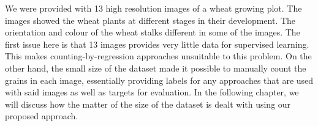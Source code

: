 We were provided with 13 high resolution images of a wheat growing plot. The images showed the wheat plants at different stages in their development. The orientation and colour of the wheat stalks different in some of the images. 
The first issue here is that 13 images provides very little data for supervised learning. This makes counting-by-regression approaches unsuitable to this problem. On the other hand, the small size of the dataset made it possible to manually count the grains in each image, essentially providing labels for any approaches that are used with said images as well as targets for evaluation. In the following chapter, we will discuss how the matter of the size of the dataset is dealt with using our proposed approach.







